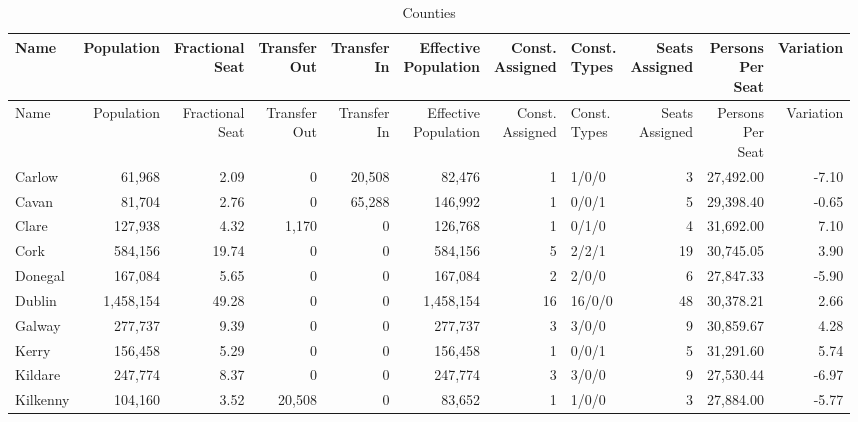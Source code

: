 \documentclass[a4paper]{article}
\begin{document}
\begin{longtable}{lrrrrrrlrrr}
\caption{Counties}
\\ \toprule
Name &Population &\shortstack{Fractional\\Seat} &\shortstack{Transfer\\Out} &\shortstack{Transfer\\In} &\shortstack{Effective\\Population} &\shortstack{Const.\\Assigned} &\shortstack{Const.\\Types} &\shortstack{Seats\\Assigned} &\shortstack{Persons\\Per\\Seat} &Variation \\ \midrule
\endfirsthead
\toprule
Name &Population &\shortstack{Fractional\\Seat} &\shortstack{Transfer\\Out} &\shortstack{Transfer\\In} &\shortstack{Effective\\Population} &\shortstack{Const.\\Assigned} &\shortstack{Const.\\Types} &\shortstack{Seats\\Assigned} &\shortstack{Persons\\Per\\Seat} &Variation \\ \midrule
\endhead
\bottomrule
\endfoot
Carlow&61,968& 2.09&0&20,508&82,476&1&1/0/0&3&27,492.00&-7.10\\ 
Cavan&81,704& 2.76&0&65,288&146,992&1&0/0/1&5&29,398.40&-0.65\\ 
Clare&127,938& 4.32&1,170&0&126,768&1&0/1/0&4&31,692.00& 7.10\\ 
Cork&584,156&19.74&0&0&584,156&5&2/2/1&19&30,745.05& 3.90\\ 
Donegal&167,084& 5.65&0&0&167,084&2&2/0/0&6&27,847.33&-5.90\\ 
Dublin&1,458,154&49.28&0&0&1,458,154&16&16/0/0&48&30,378.21& 2.66\\ 
Galway&277,737& 9.39&0&0&277,737&3&3/0/0&9&30,859.67& 4.28\\ 
Kerry&156,458& 5.29&0&0&156,458&1&0/0/1&5&31,291.60& 5.74\\ 
Kildare&247,774& 8.37&0&0&247,774&3&3/0/0&9&27,530.44&-6.97\\ 
Kilkenny&104,160& 3.52&20,508&0&83,652&1&1/0/0&3&27,884.00&-5.77\\ 

\end{longtable}
\end{document}
